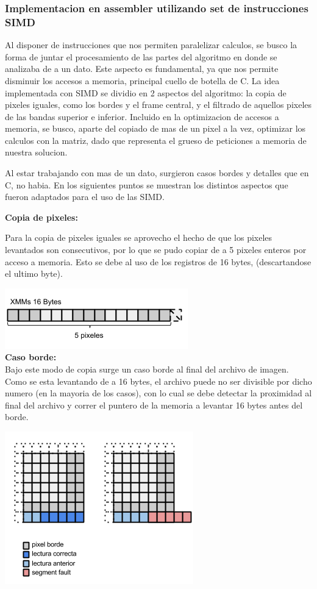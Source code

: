 \subsubsection{Implementacion en assembler utilizando set de instrucciones SIMD}

Al disponer de instrucciones que nos permiten paralelizar calculos, se busco la forma de juntar el procesamiento de las partes del algoritmo en donde se analizaba de a un dato. Este aspecto es fundamental, ya que nos permite disminuir los accesos a memoria, principal cuello de botella de C. La idea implementada con SIMD se dividio en 2 aspectos del algoritmo: la copia de pixeles iguales, como los bordes y el frame central, y el filtrado de aquellos pixeles de las bandas superior e inferior. Incluido en la optimizacion de accesos a memoria, se busco, aparte del copiado de mas de un pixel a la vez, optimizar los calculos con la matriz, dado que representa el grueso de peticiones a memoria de nuestra solucion.

Al estar trabajando con mas de un dato, surgieron casos bordes y detalles que en C, no habia. En los siguientes puntos se muestran los distintos aspectos que fueron adaptados para el uso de las SIMD.

\textbf{Copia de pixeles:}

Para la copia de pixeles iguales se aprovecho el hecho de que los pixeles levantados son consecutivos, por lo que se pudo copiar de a 5 pixeles enteros por acceso a memoria. Esto se debe al uso de los registros de 16 bytes, (descartandose el ultimo byte).

\includegraphics[scale=0.7]{imagenes/xmm-pixeles.png} 
\\
\textbf{Caso borde:}
\\
Bajo este modo de copia surge un caso borde al final del archivo de imagen. Como se esta levantando de a 16 bytes, el archivo puede no ser divisible por dicho numero (en la mayoria de los casos), con lo cual se debe detectar la proximidad al final del archivo y correr el puntero de la memoria a levantar 16 bytes antes del borde.

\includegraphics[scale=0.7]{imagenes/caso-borde-5.png} 

